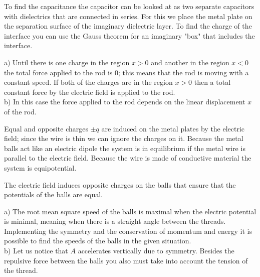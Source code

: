 \documentclass[11pt]{article}
\begin{document}

\hinteng
To find the capacitance the capacitor can be looked at as two separate capacitors with dielectrics that are connected in series. For this we place the metal plate on the separation surface of the imaginary dielectric layer. To find the charge of the interface you can use the Gauss theorem for an imaginary "box" that includes the interface.
\probend
\bigskip


\hinteng
a) Until there is one charge in the region $x>0$ and another in the region $x<0$ the total force applied to the rod is 0; this means that the rod is moving with a constant speed. If both of the charges are in the region $x>0$ then a total constant force by the electric field is applied to the rod.\\
b) In this case the force applied to the rod depends on the linear displacement $x$ of the rod.
\probend
\bigskip


\hinteng
Equal and opposite charges $\pm q$ are induced on the metal plates by the electric field; since the wire is thin we can ignore the charges on it. Because the metal balls act like an electric dipole the system is in equilibrium if the metal wire is parallel to the electric field. Because the wire is made of conductive material the system is equipotential.
\probend
\bigskip


\hinteng
The electric field induces opposite charges on the balls that ensure that the potentials of the balls are equal.
\probend
\bigskip


\hinteng
a) The root mean square speed of the balls is maximal when the electric potential is minimal, meaning when there is a straight angle between the threads. Implementing the symmetry and the conservation of momentum and energy it is possible to find the speeds of the balls in the given situation.\\
b) Let us notice that $A$ accelerates vertically due to symmetry. Besides the repulsive force between the balls you also must take into account the tension of the thread.
\probend
\bigskip
\end{document}
